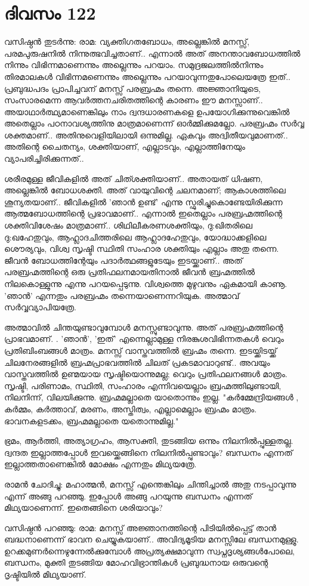  
\section{ദിവസം 122}


വസിഷ്ഠന്‍ തുടര്‍ന്നു: രാമ: വ്യക്തിഗതബോധം, അല്ലെങ്കില്‍ മനസ്സ്‌, പരമപുരുഷനില്‍ നിന്നുത്ഭവിച്ചതാണ്‌.. എന്നാല്‍ അത്‌ അനന്താവബോധത്തില്‍ നിന്നും വിഭിന്നമാണെന്നും അല്ലെന്നും പറയാം. സമുദ്രജലത്തില്‍നിന്നും തിരമാലകള്‍ വിഭിന്നമണെന്നും അല്ലെന്നും പറയാവുന്നതുപോലെയത്രേ ഇത്‌.. പ്രബുദ്ധപദം പ്രാപിച്ചവന്‌ മനസ്സ്‌ പരബ്രഹ്മം തന്നെ. അജ്ഞാനിയുടെ, സംസാരമെന്ന ആവര്‍ത്തനചരിതത്തിന്റെ കാരണം ഈ മനസ്സാണ്‌.. അയാഥാര്‍ത്ഥ്യമാണെങ്കിലും നാം ദ്വന്ദധാരണകളെ ഉപയോഗിക്കുന്നുവെങ്കില്‍ അതെല്ലാം പഠനാവശ്യത്തിനു മാത്രമാണെന്ന് ഓര്‍മ്മിക്കുമല്ലോ. പരബ്രഹ്മം സര്‍വ്വ ശക്തമാണ്‌.. അതിനുവെളിയിലായി ഒന്നുമില്ല. ഏകവും അദ്വിതീയവുമാണത്‌.. അതിന്റെ ചൈതന്യം, ശക്തിയാണ്‌, എല്ലാടവും, എല്ലാത്തിനേയും വ്യാപരിച്ചിരിക്കുന്നത്‌..

ശരീരമുള്ള ജീവികളില്‍ അത്‌ ചിത്ശക്തിയാണ്‌.. അതായത്‌ ധിഷണ, അല്ലെങ്കില്‍ ബോധശക്തി. അത്‌ വായുവിന്റെ ചലനമാണ്‌; ആകാശത്തിലെ ശൂന്യതയാണ്‌.. ജീവികളില്‍ 'ഞാന്‍ ഉണ്ട്‌' എന്നു സ്ഫുരിച്ചുകൊണ്ടേയിരിക്കുന്ന ആത്മബോധത്തിന്റെ പ്രഭാവമാണ്‌.. എന്നാല്‍ ഇതെല്ലാം പരബ്രഹ്മത്തിന്റെ ശക്തിവിശേഷം മാത്രമാണ്‌.. ശിഥിലീകരണശക്തിയും, ദു:ഖിതരിലെ ദു:ഖഹേതുവും, ആഹ്ലാദചിത്തരിലെ ആഹ്ലാദഹേതുവും, യോദ്ധാക്കളിലെ ശൌര്യവും, വിശ്വ സൃഷ്ടി സ്ഥിതി സംഹാര ശക്തിയും എല്ലാം അതു തന്നെ. ജീവന്‍ ബോധത്തിന്റേയും പദാര്‍ത്ഥങ്ങളുടേയും ഇടയ്ക്കാണ്‌.. അത്‌ പരബ്രഹ്മത്തിന്റെ ഒരു പ്രതിഫലനമായതിനാല്‍ ജീവന്‍ ബ്രഹ്മത്തില്‍ നിലകൊള്ളുന്നു എന്നു പറയപ്പെടുന്നു. വിശ്വത്തെ മുഴുവനും ഏകമായി കാണൂ. 'ഞാന്‍' എന്നതും പരബ്രഹ്മം തന്നെയാണെന്നറിയുക. അത്മാവ്‌ സര്‍വ്വവ്യാപിയത്രേ.

അത്മാവില്‍ ചിന്തയുണ്ടാവുമ്പോള്‍ മനസ്സുണ്ടാവുന്നു. അത്‌ പരബ്രഹ്മത്തിന്റെ പ്രാഭവമാണ്‌. . 'ഞാന്‍', 'ഇത്‌' എന്നെല്ലാമുള്ള നിരങ്കുശവിഭിന്നതകള്‍ വെറും പ്രതിബിംബങ്ങള്‍ മാത്രം. മനസ്സ്‌ വാസ്തവത്തില്‍ ബ്രഹ്മം തന്നെ. ഇടയ്ക്കിടയ്ക്ക്‌ ചിലനേരങ്ങളില്‍ ബ്രഹ്മപ്രാഭവത്തില്‍ ചിലത്‌ പ്രകടമാവാറുണ്ട്‌.. അവയും വാസ്തവത്തില്‍ ഉണ്മയായ സൃഷ്ടിയൊന്നുമല്ല; വെറും പ്രതിഫലനങ്ങള്‍ മാത്രം. സൃഷ്ടി, പരിണാമം, സ്ഥിതി, സംഹാരം എന്നിവയെല്ലാം ബ്രഹ്മത്തിലുണ്ടായി, നിലനിന്ന്, വിലയിക്കുന്നു. ബ്രഹ്മമല്ലാതെ യാതൊന്നും ഇല്ല. "കര്‍മ്മേന്ദ്രിയങ്ങള്‍ , കര്‍മ്മം, കര്‍ത്താവ്‌, മരണം, അസ്തിത്വം, എല്ലാമെല്ലാം ബ്രഹ്മം മാത്രം. ഭാവനകളടക്കം, ബ്രഹ്മമല്ലാതെ യതൊന്നുമില്ല."

ഭ്രമം, ആര്‍ത്തി, അത്യാഗ്രഹം, ആസക്തി, തുടങ്ങിയ ഒന്നും നിലനില്‍പ്പുള്ളതല്ല. ദ്വന്ദത ഇല്ലാത്തപ്പോള്‍ ഇവയ്ക്കെങ്ങിനെ നിലനില്‍പ്പുണ്ടാവും? ബന്ധനം എന്നത്‌ ഇല്ലാത്തതാണെങ്കില്‍ മോക്ഷം എന്നതും മിഥ്യയത്രേ.

രാമന്‍ ചോദിച്ചു: മഹാത്മന്‍, മനസ്സ്‌ എന്തെങ്കിലും ചിന്തിച്ചാല്‍ അതു നടപ്പാവുന്നു എന്ന് അങ്ങു പറഞ്ഞു. ഇപ്പോള്‍ അങ്ങു പറയുന്നു ബന്ധനം എന്നത്‌ മിഥ്യയാണെന്ന്. ഇതെങ്ങിനെ ശരിയാവും?

വസിഷ്ഠന്‍ പറഞ്ഞു: രാമ: മനസ്സ്‌ അജ്ഞാനത്തിന്റെ പിടിയില്‍പ്പെട്ട്‌ താന്‍ ബദ്ധനാണെന്ന് ഭാവന ചെയ്യുകയാണ്‌.. അവിദ്യമൂടിയ മനസ്സിലേ ബന്ധനമുള്ളു. ഉറക്കമുണര്‍ന്നെഴുന്നേല്‍ക്കുമ്പോള്‍ അപ്രത്യക്ഷമാവുന്ന സ്വപ്നദൃശ്യങ്ങള്‍പോലെ, ബന്ധനം, മുക്തി തുടങ്ങിയ മോഹവിഭ്രാന്തികള്‍ പ്രബുദ്ധനായ ഒരുവന്റെ ദൃഷ്ടിയില്‍ മിഥ്യയാണ്‌.

